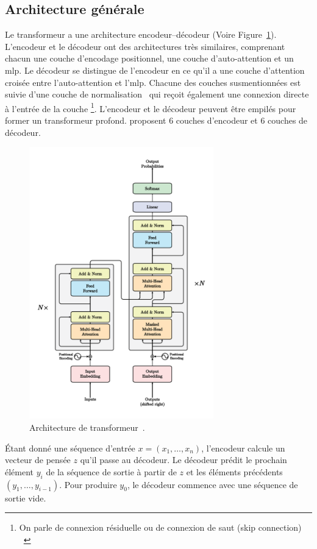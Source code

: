 \subsection{Architecture générale}

Le transformeur a une architecture encodeur--décodeur (Voire Figure~\ref{fig.transformer}).
L'encodeur et le décodeur ont des architectures très similaires, 
comprenant chacun une couche d'encodage positionnel, une couche d'auto-attention et un \gls{mlp}.
Le décodeur se distingue de l'encodeur 
en ce qu'il a une couche d'attention croisée entre l'auto-attention et l'\gls{mlp}.
Chacune des couches susmentionnées est suivie d'une couche de normalisation~\cite{Ba_Kiros_Hinton_2016}
qui reçoit également une connexion directe à l'entrée de la couche%
\footnote{%
    On parle de connexion résiduelle ou de connexion de saut \foreignlanguage{english}{(skip connection)}%
    ~\cite{He_Zhang_Ren_Sun_2016}
}.
L'encodeur et le décodeur peuvent être empilés pour former un transformeur profond.
 proposent 6 couches d'encodeur et 6 couches de décodeur.

\begin{figure}[htb]
    \centering
    \includegraphics[width=8cm]{assets/images/transformer.png}
    \caption[L'architecture de transformeur.]
    {Architecture de transformeur~\cite[Fig 1]{attention}.}
    \label{fig.transformer}
\end{figure}

Étant donné une séquence d'entrée \(x = (x_1, \ldots, x_n)\),
l'encodeur calcule un vecteur de pensée \(z\) qu'il passe au décodeur.
Le décodeur prédit le prochain élément \(y_i\) de la séquence de sortie 
à partir de \(z\) et les éléments précédents \((y_1, \ldots, y_{i-1})\).
Pour produire \(y_0\), le décodeur commence avec une séquence de sortie vide.
